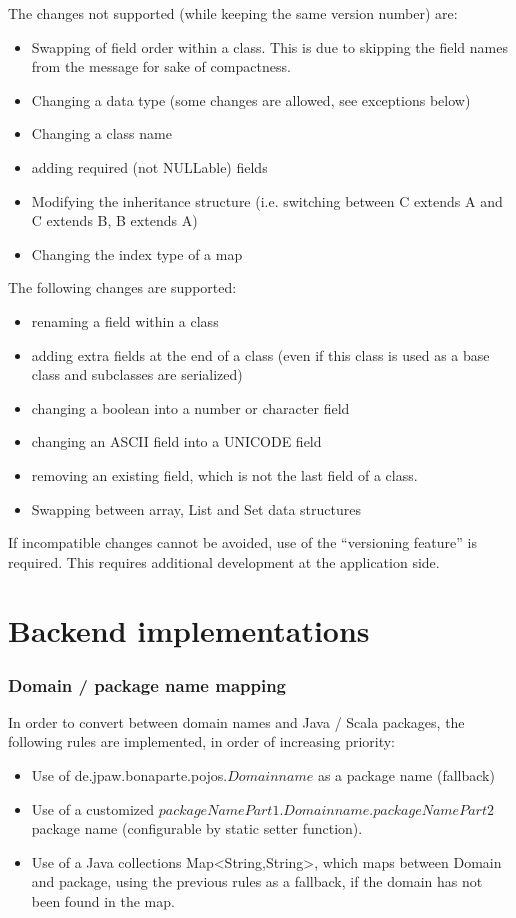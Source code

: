 \documentclass[11pt,a4paper,oneside]{article}
\begin{document}
The changes not supported (while keeping the same version number) are:
\begin{itemize}
    \item Swapping of field order within a class. This is due to skipping the field names from the message for sake of
    compactness.
    \item Changing a data type (some changes are allowed, see exceptions below)
    \item Changing a class name
    \item adding required (not NULLable) fields
    \item Modifying the inheritance structure (i.e. switching between C extends A and C extends B, B extends A)
    \item Changing the index type of a map
\end{itemize}

The following changes are supported:
\begin{itemize}
    \item renaming a field within a class
    \item adding extra fields at the end of a class (even if this class is used as a base class and subclasses are serialized)
    \item changing a boolean into a number or character field
    \item changing an ASCII field into a UNICODE field
    \item removing an existing field, which is not the last field of a class.
    \item Swapping between array, List and Set data structures
\end{itemize}

If incompatible changes cannot be avoided, use of the ``versioning feature'' is required. This requires additional development
at the application side.







\section{Backend implementations}

\subsubsection{Domain / package name mapping}
In order to convert between domain names and Java / Scala packages, the following rules are implemented, in order of increasing
priority:
\begin{itemize}
    \item Use of {\ttfamily de.jpaw.bonaparte.pojos.}$Domainname$ as a package name (fallback)
    \item Use of a customized $packageNamePart1$.$Domainname$.$packageNamePart2$ package name (configurable by static setter
    function).
    \item Use of a Java collections {\ttfamily Map<String,String>}, which maps between Domain and package, using the previous rules as a
    fallback, if the domain has not been found in the map.
\end{itemize}
\end{document}
